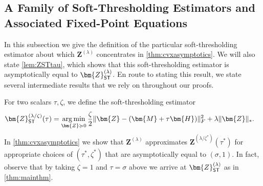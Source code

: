 \documentclass[10pt]{article}
\DeclareMathOperator*{\argmin}{arg\,min}
\newcommand{\s}{^*}
\theoremstyle{definition}
\begin{document}
\subsection{A Family of Soft-Thresholding Estimators and Associated Fixed-Point Equations} \label{sec:softthresholding}
In this subsection we give the definition of the particular soft-thresholding estimator about which $\bm{Z}^{(\lambda)}$ concentrates in  \cref{thm:cvxasymptotics}. We will also state \cref{lem:ZSTtau}, which shows that this soft-thresholding estimator is asymptotically equal to $\bm{Z}_{{\sf ST}}^{(\lambda)}$.  En route to stating this result, we state several intermediate results that we rely on throughout our proofs.

For two scalars  $\tau,\zeta$, we define the soft-thresholding estimator
\begin{align}
    \bm{Z}_{{\sf ST}}^{(\lambda/\zeta)}(\tau) &= \argmin_{\bm{Z} \succcurlyeq 0} \frac{\zeta}{2} \| \bm{Z} - (\bm{M} + \tau \bm{H}) \|_F^2 + \lambda \| \bm{Z} \|_*.
\end{align}
In \cref{thm:cvxasymptotics} we show that $\bm{Z}^{(\lambda)}$ approximates $\bm{Z}^{(\lambda/\zeta\s)}(\tau\s)$ for appropriate choices of $(\tau\s,\zeta\s)$ that are asymptotically equal to $(\sigma,1)$. In fact, observe that by taking $\zeta = 1$ and $\tau = \sigma$ above we arrive at $\bm{Z}_{{\sf ST}}^{(\lambda)}$ as in \cref{thm:mainthm}.
\end{document}
